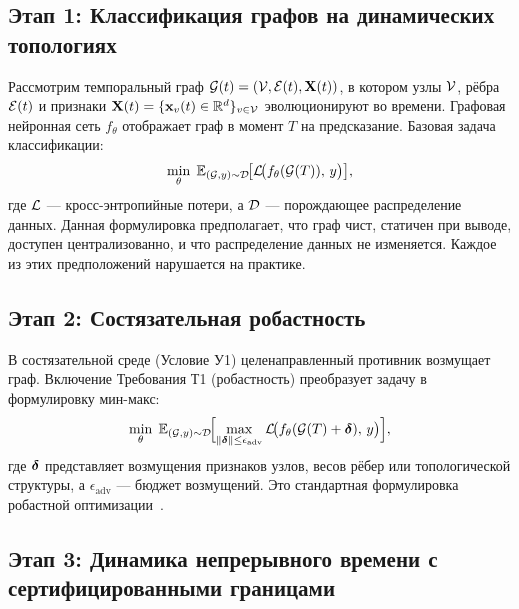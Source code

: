 \subsection{Этап 1: Классификация графов на динамических топологиях}

Рассмотрим темпоральный граф $\mathcal{G}(t)=(\mathcal{V},\mathcal{E}(t),\mathbf{X}(t))$, в котором узлы $\mathcal{V}$, рёбра $\mathcal{E}(t)$ и признаки $\mathbf{X}(t)=\{\mathbf{x}_v(t)\in\mathbb{R}^{d}\}_{v\in\mathcal{V}}$ эволюционируют во времени. Графовая нейронная сеть $f_\theta$ отображает граф в момент $T$ на предсказание. Базовая задача классификации:
\begin{equation}
\min_\theta\;
\mathbb{E}_{(\mathcal{G},y)\sim\mathcal{D}}\!\bigl[
  \mathcal{L}\!\bigl(f_\theta(\mathcal{G}(T)),\,y\bigr)
\bigr],
\label{eq:ps_base}
\end{equation}
где $\mathcal{L}$ --- кросс-энтропийные потери, а $\mathcal{D}$ --- порождающее распределение данных. Данная формулировка предполагает, что граф чист, статичен при выводе, доступен централизованно, и что распределение данных не изменяется. Каждое из этих предположений нарушается на практике.


\subsection{Этап 2: Состязательная робастность}

В состязательной среде (Условие У1) целенаправленный противник возмущает граф. Включение Требования Т1 (робастность) преобразует задачу в формулировку мин-макс:
\begin{equation}
\min_\theta\;
\mathbb{E}_{(\mathcal{G},y)\sim\mathcal{D}}\!\Bigl[
  \max_{\|\boldsymbol{\delta}\|\le\epsilon_{\mathrm{adv}}}
    \mathcal{L}\!\bigl(f_\theta(\mathcal{G}(T)+\boldsymbol{\delta}),\,y\bigr)
\Bigr],
\label{eq:ps_robust}
\end{equation}
где $\boldsymbol{\delta}$ представляет возмущения признаков узлов, весов рёбер или топологической структуры, а $\epsilon_{\mathrm{adv}}$ --- бюджет возмущений. Это стандартная формулировка робастной оптимизации~\cite{Madry2018,Goodfellow2015,Szegedy2014}.


\subsection{Этап 3: Динамика непрерывного времени с сертифицированными границами}


